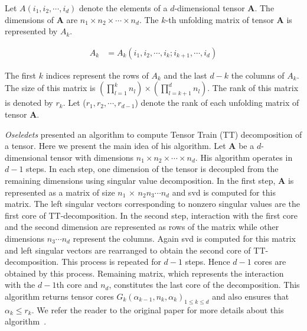 \documentclass[runningheads]{llncs}
\newcommand{\tensor}[1]{\cal\textbf{#1}\xspace}
\begin{document}
Let $A(i_1,i_2,\cdots, i_d)$ denote the elements of a $d$-dimensional tensor \tensor{A}. The dimensions of \tensor{A} are $n_1 \times n_2 \times \cdots \times n_d$. The $k$-th unfolding matrix of tensor \tensor{A} is represented by $A_k$.

\begin{align*}
A_k &= A_k(i_1, i_2,\cdots, i_k; i_{k+1},\cdots ,i_d)
\end{align*}

\noindent The first $k$ indices represent the rows of $A_k$ and the last $d-k$ the columns of $A_k$. The size of this matrix is $(\prod_{l=1}^{k}n_l)\times(\prod_{l=k+1}^{d}n_l)$. The rank of this matrix is denoted by $r_k$. Let ($r_1, r_2,\cdots, r_{d-1}$)  denote the rank of each unfolding matrix of tensor \tensor{A}.


\noindent \textit{Oseledets} presented an algorithm to compute Tensor Train (TT) decomposition of a tensor. Here we present the main idea of his algorithm. Let \tensor{A} be a $d$-dimensional tensor with dimensions $n_1 \times n_2 \times \cdots \times n_d$. His algorithm operates in $d-1$ steps. In each step, one dimension of the tensor is decoupled from the remaining dimensions using singular value decomposition. In the first step, \tensor{A} is represented as a matrix of size $n_1$ $\times$ $n_2 n_3 \cdots n_d$ and svd is computed for this matrix. The left singular vectors corresponding to nonzero singular values are the first core of TT-decomposition. In the second step, interaction with the first core and the second dimension are represented as rows of the matrix while other dimensions $n_3\cdots n_d$ represent the columns. Again svd is computed for this matrix and  left singular vectors are rearranged to obtain the second  core of TT-decomposition. This process is repeated for $d-1$ steps. Hence $d-1$ cores are obtained by this process. Remaining matrix, which represents the interaction with the $d-1$th core and $n_d$, constitutes the last core of the decomposition. This algorithm returns tensor cores $G_k(\alpha_{k-1}, n_k, \alpha_k) _{1\le k\le d}$ and also ensures that $\alpha_k \le r_k$. We refer the reader to the original paper for more details about this algorithm~\cite{tt}. 
\end{document}
